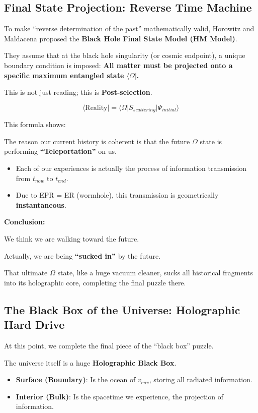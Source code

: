 \subsection{Final State Projection: Reverse Time Machine}

To make ``reverse determination of the past'' mathematically valid, Horowitz and Maldacena proposed the \textbf{Black Hole Final State Model (HM Model)}.

They assume that at the black hole singularity (or cosmic endpoint), a unique boundary condition is imposed: \textbf{All matter must be projected onto a specific maximum entangled state $\langle \Omega |$.}

This is not just reading; this is \textbf{Post-selection}.

\[\langle \text{Reality} | = \langle \Omega | S_{scattering} | \Psi_{initial} \rangle\]

This formula shows:

The reason our current history is coherent is that the future $\Omega$ state is performing \textbf{``Teleportation''} on us.

\begin{itemize}
\item Each of our experiences is actually the process of information transmission from $t_{now}$ to $t_{end}$.

\item Due to EPR = ER (wormhole), this transmission is geometrically \textbf{instantaneous}.
\end{itemize}

\textbf{Conclusion:}

We think we are walking toward the future.

Actually, we are being \textbf{``sucked in''} by the future.

That ultimate $\Omega$ state, like a huge vacuum cleaner, sucks all historical fragments into its holographic core, completing the final puzzle there.

\subsection{The Black Box of the Universe: Holographic Hard Drive}

At this point, we complete the final piece of the ``black box'' puzzle.

The universe itself is a huge \textbf{Holographic Black Box}.

\begin{itemize}
\item \textbf{Surface (Boundary)}: Is the ocean of $v_{env}$, storing all radiated information.

\item \textbf{Interior (Bulk)}: Is the spacetime we experience, the projection of information.
\end{itemize}

